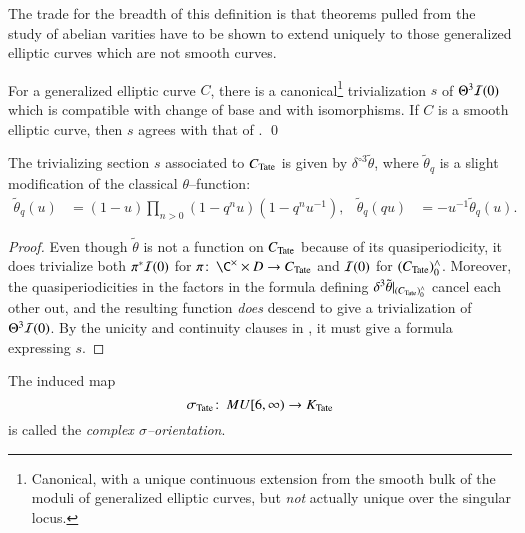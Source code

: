 \noindent The trade for the breadth of this definition is that theorems pulled from the study of abelian varities have to be shown to extend uniquely to those generalized elliptic curves which are not smooth curves.

\begin{theorem}\label{GeneralizedTheta3IsTrivial}
For a generalized elliptic curve $C$, there is a canonical\footnote{Canonical, with a unique continuous extension from the smooth bulk of the moduli of generalized elliptic curves, but \emph{not} actually unique over the singular locus.} trivialization $s$ of $\Theta^3 \mathcal{I}(0)$ which is compatible with change of base and with isomorphisms.  If $C$ is a smooth elliptic curve, then $s$ agrees with that of . \qed
\end{theorem}

\begin{corollary}\label{D3thetaTrivializes}
The trivializing section $s$ associated to $C_{\mathrm{Tate}}$ is given by $\delta^{\circ 3} \tilde \theta$, where $\tilde \theta_q$ is a slight modification of the classical $\theta$--function:
\begin{align*}
\tilde \theta_q(u) & = (1 - u)\prod_{n > 0}(1 - q^n u)(1 - q^n u^{-1}), &
\tilde \theta_q(qu) & = -u^{-1} \tilde\theta_q(u).
\end{align*}
\end{corollary}
\begin{proof}
Even though $\tilde \theta$ is not a function on $C_{\mathrm{Tate}}$ because of its quasiperiodicity, it does trivialize both $\pi^* \mathcal{I}(0)$ for $\pi\co \C^\times \times D \to C_{\Tate}$ and $\mathcal{I}(0)$ for $(C_{\mathrm{Tate}})^\wedge_0$.  Moreover, the quasiperiodicities in the factors in the formula defining $\delta^3 \tilde \theta|_{(C_{\mathrm{Tate}})^\wedge_0}$ cancel each other out, and the resulting function \emph{does} descend to give a trivialization of $\Theta^3 \mathcal{I}(0)$.  By the unicity and continuity clauses in , it must give a formula expressing $s$.
\end{proof}

\begin{definition}
The induced map \[\sigma_{\mathrm{Tate}}\colon\thinspace MU[6, \infty) \to K_{\mathrm{Tate}}\] is called the \textit{complex $\sigma$--orientation}.
\end{definition}

